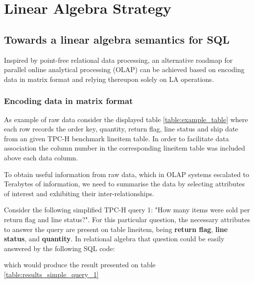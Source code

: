 \section{Linear Algebra Strategy}
\indent
\subsection{Towards a linear algebra semantics for SQL}

Inspired by point-free relational data processing, an alternative roadmap for parallel online analytical processing (OLAP) can be achieved based on encoding data in matrix format and relying thereupon solely on LA operations\cite{macedo2011middle}. 

\subsubsection{Encoding data in matrix format}

As example of raw data consider the displayed table \ref{table:example_table} where each row records the order key, quantity, return flag, line status and ship date from an given TPC-H benchmark lineitem table. In order to facilitate data association the column number in the corresponding lineitem table was included above each data column.


To obtain useful information from raw data, which in OLAP systems escalated to Terabytes of information, we need to summarise the data by selecting attributes of interest and exhibiting their inter-relationships.\par 
Consider the following simplified TPC-H query 1: "How many items were sold per return flag and line status?". For this particular question, the necessary attributes to answer the query are present on table lineitem, being \textbf{return flag}, \textbf{line status}, and \textbf{quantity}. In relational algebra that question could be easily answered by the following SQL code:



which would produce the result presented on table \ref{table:results_simple_query_1}


